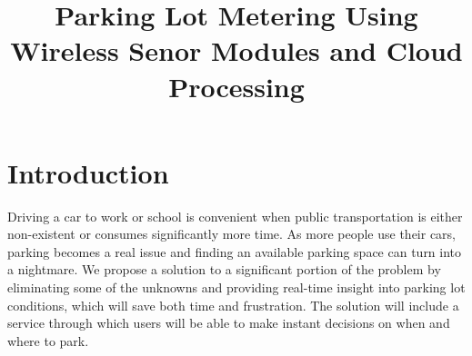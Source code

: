 \documentclass[letterpaper,10 pt,conference,onecolumn]{IEEEtran}
\begin{document}
	
	
	
	\title{
		Parking Lot Metering Using Wireless Senor Modules and Cloud Processing
	}

	\author{
	
	}

	\maketitle
	
	
	
	\begin{abstract}
	
	\end{abstract}

	
	\section{Introduction}
Driving a car to work or school is convenient when public transportation is either non-existent or consumes significantly more time. As more people use their cars, parking becomes a real issue and finding an available parking space can turn into a nightmare. We propose a solution to a significant portion of the problem by eliminating some of the unknowns and providing real-time insight into parking lot conditions, which will save both time and frustration. The solution will include a service through which users will be able to make instant decisions on when and where to park.
\end{document}

